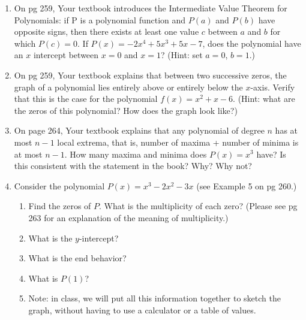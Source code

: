 \documentclass[12pt,dvipsnames]{article}
\begin{document}
\begin{enumerate}[label=\arabic*., leftmargin=2\parindent,
labelindent=\parindent, labelsep=*]
\begin{enumerate}[topsep=-50pt,itemsep=-2ex,partopsep=0ex,parsep=1ex]
\item 2 is a zero of $f(x)$, that is, $f(2)=0$;
\item $x=2$ is a solution ofthe equation $\displaystyle x^2+x-6=0$;
\item $x-2$ is a factor of $\displaystyle x^2+x-6$;
\item 2 is an $x$-intercept of the graph of $f(x)$.
\end{enumerate} 

\item On pg 259, Your textbook introduces the Intermediate Value Theorem for Polynomials: if P is a polynomial function and $P(a)$ and $P(b)$ have opposite signs, then there exists at least one value $c$ between $a$ and $b$ for which $P(c)=0$.  If  $\displaystyle P(x)=-2x^4+5x^3+5x-7$, does the polynomial have an $x$ intercept between $x=0$ and $x=1$? (Hint: set $a=0$, $b=1$.)

\item On pg 259, Your textbook explains that between two successive zeros, the graph of a polynomial lies entirely above or entirely below the $x$-axis. Verify that this is the case for the polynomial $\displaystyle f(x)=x^2+x-6$. (Hint: what are the zeros of this polynomial? How does the graph look like?)

\item On page 264, Your textbook explains that any polynomial of degree $n$ has at most $n-1$ local extrema, that is, number of maxima + number of minima is at most $n-1$. How many maxima and minima does $P(x)=x^3$ have? Is this consistent with the statement in the book? Why? Why not?

\item \label{item:graph1} Consider the polynomial $\displaystyle P(x)=x^3-2x^2-3x$ (see Example 5 on pg 260.)

\begin{enumerate}[topsep=-50pt,itemsep=-2ex,partopsep=0ex,parsep=1ex]
\item Find the zeros of $P$. What is the multiplicity of each zero? (Please see pg 263 for an explanation of the meaning of multiplicity.)
\item What is the $y$-intercept?
\item What is the end behavior? 
\item What is $P(1)$?
\item Note: in class, we will put all this information together to sketch the graph, without having to use a calculator or a table of values.
\end{enumerate}


\end{enumerate}
\end{document}
